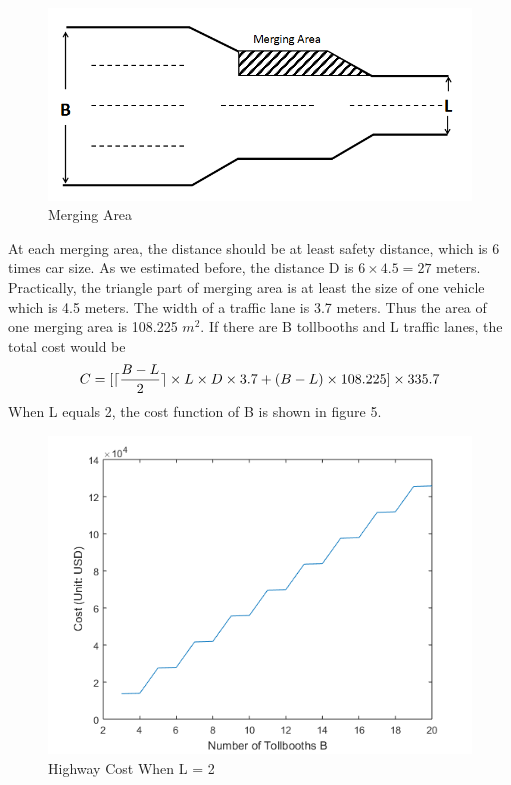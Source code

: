 \begin{figure}[h]
\small
\centering
\includegraphics[width=12cm]{Merging_Area.png}
\caption{Merging Area} \label{fig: Merging Area}
\end{figure}
\noindent
At each merging area, the distance should be at least safety distance, which is 6 times car size. As we estimated before, the distance D is $6\times 4.5 = 27$ meters. Practically, the triangle part of merging area is at least the size of one vehicle which is 4.5 meters. The width of a traffic lane is 3.7 meters. Thus the area of one merging area is 108.225 $m^2$. If there are B tollbooths and L traffic lanes, the total cost would be\\
\[
C = [\ceil {\frac{B-L}{2}} \times L \times D \times 3.7 + (B-L)\times 108.225]\times 335.7
\]
\noindent
When L equals 2, the cost function of B is shown in figure 5.
\begin{figure}[h]
\small
\centering
\includegraphics[width=12cm]{cost.png}
\caption{Highway Cost When L = 2} \label{fig: Highway Cost when L = 2}
\end{figure}

